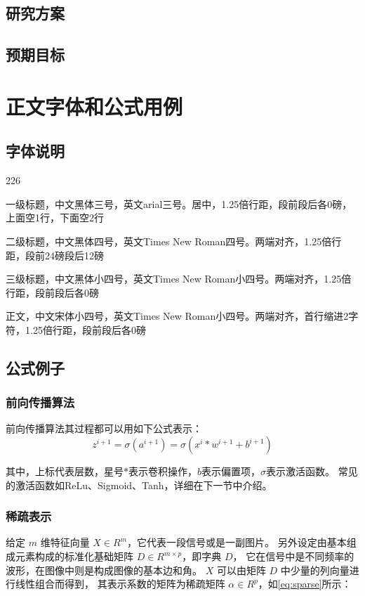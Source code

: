 \documentclass[12pt]{zjutthesis}
\begin{document}
\section{研究方案}
\section{预期目标}

\chapter{正文字体和公式用例}
\section{字体说明}
\begin{dinglist}{226}
  \item 一级标题，中文黑体三号，英文arial三号。居中，1.25倍行距，段前段后各0磅，上面空1行，下面空2行
  \item 二级标题，中文黑体四号，英文Times New Roman四号。两端对齐，1.25倍行距，段前24磅段后12磅
  \item 三级标题，中文黑体小四号，英文Times New Roman小四号。两端对齐，1.25倍行距，段前段后各0磅
  \item 正文，中文宋体小四号，英文Times New Roman小四号。两端对齐，首行缩进2字符，1.25倍行距，段前段后各0磅
\end{dinglist}

\section{公式例子}
\subsection{前向传播算法}
前向传播算法其过程都可以用如下公式表示：
\begin{equation}
  z^{i+1}=\sigma(a^{i+1})=\sigma(x^i\ast w^{i+1}+b^{i+1})
\end{equation}

其中，上标代表层数，星号$\ast$表示卷积操作，$b$表示偏置项，$\sigma$表示激活函数。
常见的激活函数如ReLu、Sigmoid、Tanh，详细在下一节中介绍。

\subsection{稀疏表示}
给定 $m$ 维特征向量 $X\in R^m$，它代表一段信号或是一副图片。
另外设定由基本组成元素构成的标准化基础矩阵 $D\in R^{m\times p}$，即字典 $D$，
它在信号中是不同频率的波形，在图像中则是构成图像的基本边和角。
$X$ 可以由矩阵 $D$ 中少量的列向量进行线性组合而得到，
其表示系数的矩阵为稀疏矩阵 $\alpha\in R^p$，如\autoref{eq:sparse}所示：
\end{document}
